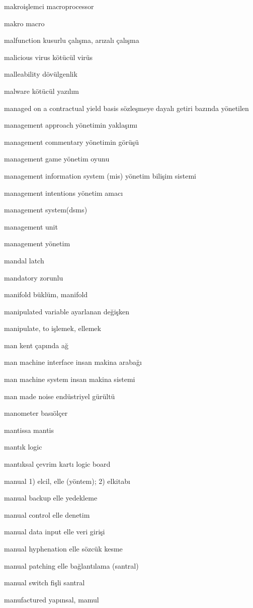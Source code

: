 \documentclass[12pt,fleqn]{article}\usepackage{../../common}
\begin{document}
makroişlemci macroprocessor

makro macro

malfunction kusurlu çalışma, arızalı çalışma

malicious virus kötücül virüs

malleability dövülgenlik

malware kötücül yazılım

managed on a contractual yield basis sözleşmeye dayalı getiri bazında yönetilen

management approach yönetimin yaklaşımı

management commentary yönetimin görüşü

management game yönetim oyunu

management information system (mis) yönetim bilişim sistemi

management intentions yönetim amacı

management system(dsms)

management unit

management yönetim

mandal latch

mandatory zorunlu

manifold büklüm, manifold

manipulated variable ayarlanan değişken

manipulate, to işlemek, ellemek

man kent çapında ağ

man machine interface insan makina arabağı

man machine system insan makina sistemi

man made noise endüstriyel gürültü

manometer basıölçer

mantissa mantis

mantık logic

mantıksal çevrim kartı logic board

manual 1) elcil, elle (yöntem); 2) elkitabı

manual backup elle yedekleme

manual control elle denetim

manual data input elle veri girişi

manual hyphenation elle sözcük kesme

manual patching elle bağlantılama (santral)

manual switch fişli santral

manufactured yapınsal, mamul
\end{document}
